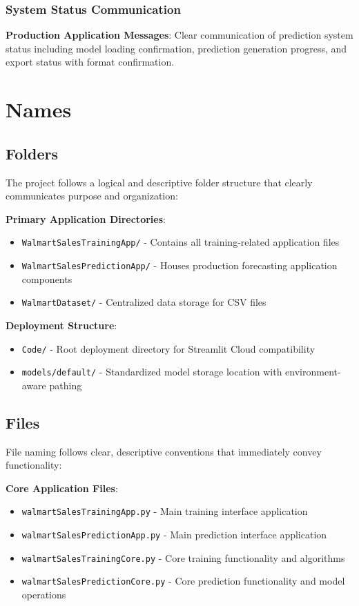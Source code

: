 \subsubsection{System Status Communication}

\textbf{Production Application Messages}: Clear communication of prediction system status including model loading confirmation, prediction generation progress, and export status with format confirmation.

\section{Names}

\subsection{Folders}

The project follows a logical and descriptive folder structure that clearly communicates purpose and organization:

\textbf{Primary Application Directories}:
\begin{itemize}
	\item \texttt{WalmartSalesTrainingApp/} - Contains all training-related application files
	\item \texttt{WalmartSalesPredictionApp/} - Houses production forecasting application components
	\item \texttt{WalmartDataset/} - Centralized data storage for CSV files
\end{itemize}

\textbf{Deployment Structure}:
\begin{itemize}
	\item \texttt{Code/} - Root deployment directory for Streamlit Cloud compatibility
	\item \texttt{models/default/} - Standardized model storage location with environment-aware pathing
\end{itemize}

\subsection{Files}

File naming follows clear, descriptive conventions that immediately convey functionality:

\textbf{Core Application Files}:
\begin{itemize}
	\item \texttt{walmartSalesTrainingApp.py} - Main training interface application
	\item \texttt{walmartSalesPredictionApp.py} - Main prediction interface application
	\item \texttt{walmartSalesTrainingCore.py} - Core training functionality and algorithms
	\item \texttt{walmartSalesPredictionCore.py} - Core prediction functionality and model operations
\end{itemize}

